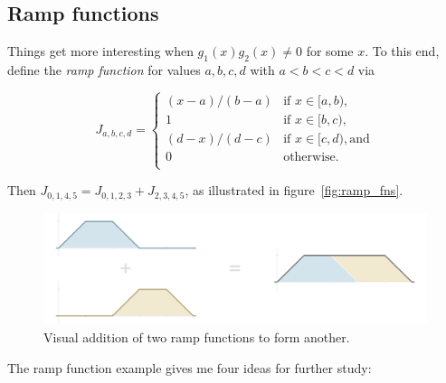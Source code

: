 \documentclass[20pt,]{extarticle}
\begin{document}
\subsection{Ramp functions}\label{sec:rampux5ffunctions}

Things get more interesting when \(g_1(x) g_2(x) \ne 0\) for some \(x\).
To this end, define the \emph{ramp function} for values \(a,b,c,d\) with
\(a < b < c < d\) via

\[ J_{a,b,c,d} = \begin{cases}
(x - a) / (b - a) & \text{if } x \in [a, b), \\
1 & \text{if } x \in [b, c), \\
(d - x) / (d - c) & \text{if } x \in [c, d), \text{and} \\
0 & \text{otherwise.} \\
\end{cases}\]

Then \(J_{0,1,4,5} = J_{0,1,2,3} + J_{2,3,4,5}\), as illustrated in
figure~\ref{fig:ramp_fns}.

\begin{figure}[htbp]
\centering
\includegraphics{images/pdfs/ramp_fns3.pdf}
\caption{\label{fig:ramp_fns}Visual addition of two ramp functions to
form another.}\label{fig:rampux5ffns}
\end{figure}

The ramp function example gives me four ideas for further study:
\end{document}
